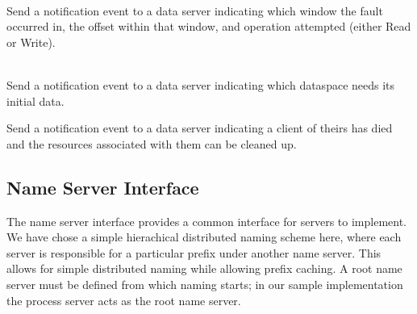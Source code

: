 \begin{description}
    \item {} \\
    Send a notification event to a data server indicating which window the fault occurred in,
    the offset within that window, and operation attempted (either Read or Write).

    \item {} \\
    Send a notification event to a data server indicating which dataspace needs its initial data.

    \item {}
    Send a notification event to a data server indicating a client of
    theirs has died and the resources associated with them can be cleaned up.
  
\end{description}

\subsection{Name Server Interface}

The name server interface provides a common interface for servers to implement. We have chose a
simple hierachical distributed naming scheme here, where each server is responsible for a particular
prefix under another name server. This allows for simple distributed naming while allowing prefix
caching. A root name server must be defined from which naming starts; in our sample implementation
the process server acts as the root name server.

